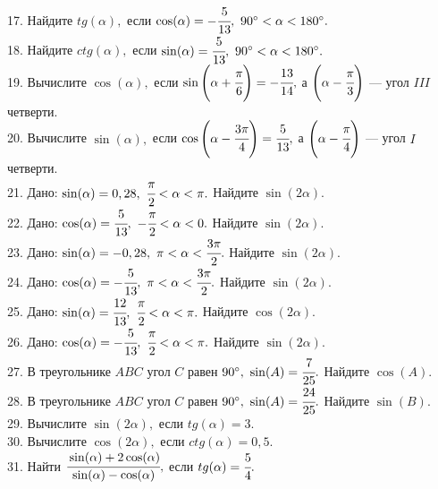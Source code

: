 17. Найдите $tg(\alpha),$ если $\cos(\alpha)=-\cfrac{5}{13},\ 90^\circ<\alpha<180^\circ.$\\
18. Найдите $ctg(\alpha),$ если $\sin(\alpha)=\cfrac{5}{13},\ 90^\circ<\alpha<180^\circ.$\\
19. Вычислите $\cos(\alpha),$ если $\sin\left(\alpha+\cfrac{\pi}{6}\right)=-\cfrac{13}{14},$ а $\left(\alpha-\cfrac{\pi}{3}\right)$ --- угол $III$ четверти.\\
20. Вычислите $\sin(\alpha),$ если $\cos\left(\alpha-\cfrac{3\pi}{4}\right)=\cfrac{5}{13},$ а $\left(\alpha-\cfrac{\pi}{4}\right)$ --- угол $I$ четверти.\\
21. Дано: $\sin(\alpha)=0,28,\ \cfrac{\pi}{2}<\alpha<\pi.$ Найдите $\sin(2\alpha).$\\
22. Дано: $\cos(\alpha)=\cfrac{5}{13},\ -\cfrac{\pi}{2}<\alpha<0.$ Найдите $\sin(2\alpha).$\\
23. Дано: $\sin(\alpha)=-0,28,\ \pi<\alpha<\cfrac{3\pi}{2}.$ Найдите $\sin(2\alpha).$\\
24. Дано: $\cos(\alpha)=-\cfrac{5}{13},\ \pi<\alpha<\cfrac{3\pi}{2}.$ Найдите $\sin(2\alpha).$\\
25. Дано: $\sin(\alpha)=\cfrac{12}{13},\ \cfrac{\pi}{2}<\alpha<\pi.$ Найдите $\cos(2\alpha).$\\
26. Дано: $\cos(\alpha)=-\cfrac{5}{13},\ \cfrac{\pi}{2}<\alpha<\pi.$ Найдите $\sin(2\alpha).$\\
27. В треугольнике $ABC$ угол $C$ равен $90^\circ,\ \sin(A)=\cfrac{7}{25}.$ Найдите $\cos(A).$\\
28. В треугольнике $ABC$ угол $C$ равен $90^\circ,\ \sin(A)=\cfrac{24}{25}.$ Найдите $\sin(B).$\\
29. Вычислите $\sin(2\alpha),$ если $tg(\alpha)=3.$\\
30. Вычислите $\cos(2\alpha),$ если $ctg(\alpha)=0,5.$\\
31. Найти $\cfrac{\sin(\alpha)+2\cos(\alpha)}{\sin(\alpha)-\cos(\alpha)},$ если $tg(\alpha)=\cfrac{5}{4}.$
\newpage
